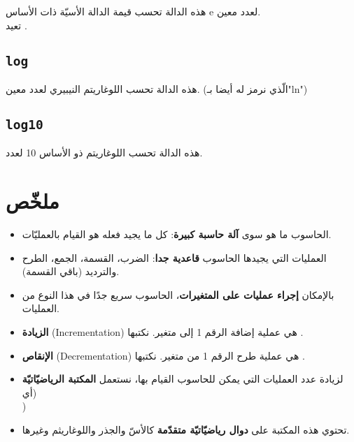 هذه الدالة تحسب قيمة الدالة الأسيّة ذات الأساس
\textenglish{e}
لعدد معين.\\
تعيد
.

\subsection{\texttt{log}}

هذه الدالة تحسب اللوغاريتم النيبيري لعدد معين. (الّذي نرمز له أيضا بـ"\textenglish{ln}")

\subsection{\texttt{log10}}

هذه الدالة تحسب اللوغاريتم ذو الأساس 10 لعدد.

\section*{ملخّص}

\begin{itemize}
  \item الحاسوب ما هو سوى
\textbf{آلة حاسبة كبيرة}: كل ما يجيد فعله هو القيام بالعمليّات.
  \item العمليات التي يجيدها الحاسوب
\textbf{قاعدية جدا}: الضرب، القسمة، الجمع، الطرح والترديد (باقي القسمة).
  \item بالإمكان
\textbf{إجراء عمليات على المتغيرات}،
الحاسوب سريع جدًا في هذا النوع من العمليات.
  \item \textbf{الزيادة}
(\textenglish{Incrementation})
هي عملية إضافة الرقم 1 إلى متغير. نكتبها
.
  \item \textbf{الإنقاص}
(\textenglish{Decrementation})
هي عملية طرح الرقم 1 من متغير. نكتبها
.
  \item لزيادة عدد العمليات التي يمكن للحاسوب القيام بها، نستعمل
\textbf{المكتبة الرياضيّاتيّة}
(أي\\
)
  \item تحتوي هذه المكتبة على
\textbf{دوال رياضيّاتيّة متقدّمة}
كالأسّ والجذر واللوغاريثم وغيرها.
\end{itemize}
